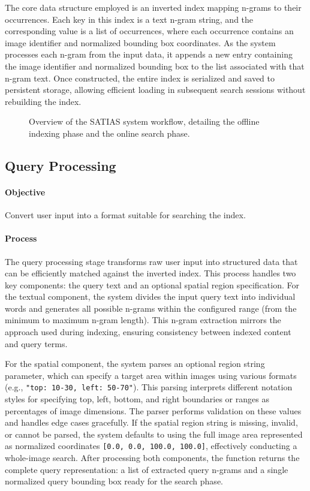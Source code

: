 \documentclass[manuscript,screen]{acmart}
\begin{document}
The core data structure employed is an inverted index mapping n-grams to their occurrences. Each key in this index is a text n-gram string, and the corresponding value is a list of occurrences, where each occurrence contains an image identifier and normalized bounding box coordinates. As the system processes each n-gram from the input data, it appends a new entry containing the image identifier and normalized bounding box to the list associated with that n-gram text. Once constructed, the entire index is serialized and saved to persistent storage, allowing efficient loading in subsequent search sessions without rebuilding the index.

\begin{figure}[ht!] %
    \centering
    \caption{Overview of the SATIAS system workflow, detailing the offline indexing phase and the online search phase.}
    \label{fig:satias_workflow}
\end{figure}

\subsection{Query Processing}

\paragraph{Objective} Convert user input into a format suitable for searching the index.

\paragraph{Process} The query processing stage transforms raw user input into structured data that can be efficiently matched against the inverted index. This process handles two key components: the query text and an optional spatial region specification. For the textual component, the system divides the input query text into individual words and generates all possible n-grams within the configured range (from the minimum to maximum n-gram length). This n-gram extraction mirrors the approach used during indexing, ensuring consistency between indexed content and query terms.

For the spatial component, the system parses an optional region string parameter, which can specify a target area within images using various formats (e.g., \verb|"top: 10-30, left: 50-70"|). This parsing interprets different notation styles for specifying top, left, bottom, and right boundaries or ranges as percentages of image dimensions. The parser performs validation on these values and handles edge cases gracefully. If the spatial region string is missing, invalid, or cannot be parsed, the system defaults to using the full image area represented as normalized coordinates \verb|[0.0, 0.0, 100.0, 100.0]|, effectively conducting a whole-image search. After processing both components, the function returns the complete query representation: a list of extracted query n-grams and a single normalized query bounding box ready for the search phase.
\end{document}
